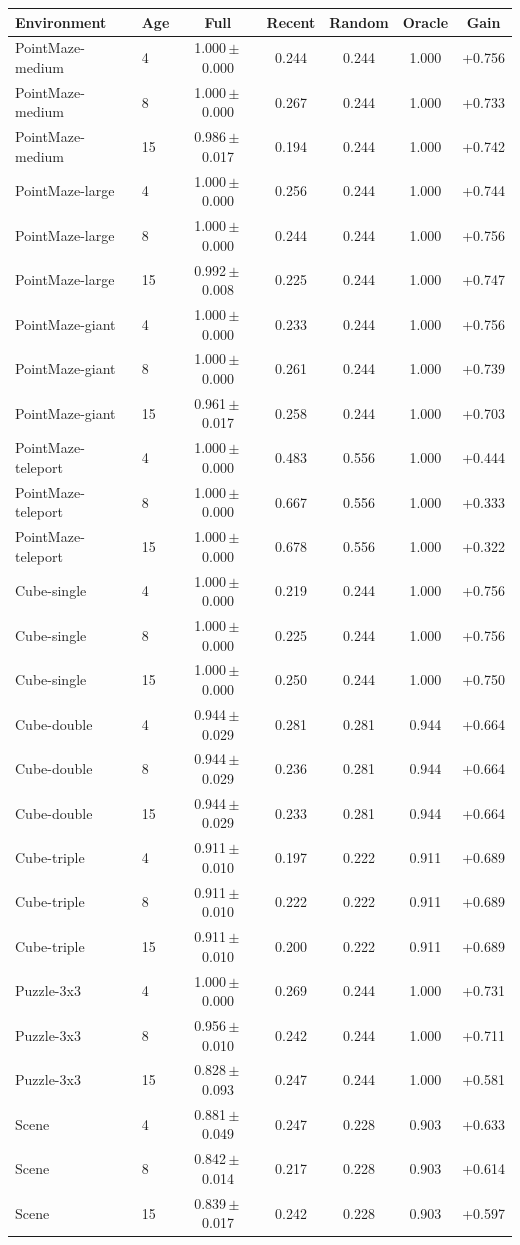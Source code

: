 \begin{tabular}{llccccc}
\toprule
Environment & Age & Full & Recent & Random & Oracle & Gain\\
\midrule
PointMaze-medium & 4 & 1.000\,$\pm$\,0.000 & 0.244 & 0.244 & 1.000 & +0.756\\
PointMaze-medium & 8 & 1.000\,$\pm$\,0.000 & 0.267 & 0.244 & 1.000 & +0.733\\
PointMaze-medium & 15 & 0.986\,$\pm$\,0.017 & 0.194 & 0.244 & 1.000 & +0.742\\
PointMaze-large & 4 & 1.000\,$\pm$\,0.000 & 0.256 & 0.244 & 1.000 & +0.744\\
PointMaze-large & 8 & 1.000\,$\pm$\,0.000 & 0.244 & 0.244 & 1.000 & +0.756\\
PointMaze-large & 15 & 0.992\,$\pm$\,0.008 & 0.225 & 0.244 & 1.000 & +0.747\\
PointMaze-giant & 4 & 1.000\,$\pm$\,0.000 & 0.233 & 0.244 & 1.000 & +0.756\\
PointMaze-giant & 8 & 1.000\,$\pm$\,0.000 & 0.261 & 0.244 & 1.000 & +0.739\\
PointMaze-giant & 15 & 0.961\,$\pm$\,0.017 & 0.258 & 0.244 & 1.000 & +0.703\\
PointMaze-teleport & 4 & 1.000\,$\pm$\,0.000 & 0.483 & 0.556 & 1.000 & +0.444\\
PointMaze-teleport & 8 & 1.000\,$\pm$\,0.000 & 0.667 & 0.556 & 1.000 & +0.333\\
PointMaze-teleport & 15 & 1.000\,$\pm$\,0.000 & 0.678 & 0.556 & 1.000 & +0.322\\
Cube-single & 4 & 1.000\,$\pm$\,0.000 & 0.219 & 0.244 & 1.000 & +0.756\\
Cube-single & 8 & 1.000\,$\pm$\,0.000 & 0.225 & 0.244 & 1.000 & +0.756\\
Cube-single & 15 & 1.000\,$\pm$\,0.000 & 0.250 & 0.244 & 1.000 & +0.750\\
Cube-double & 4 & 0.944\,$\pm$\,0.029 & 0.281 & 0.281 & 0.944 & +0.664\\
Cube-double & 8 & 0.944\,$\pm$\,0.029 & 0.236 & 0.281 & 0.944 & +0.664\\
Cube-double & 15 & 0.944\,$\pm$\,0.029 & 0.233 & 0.281 & 0.944 & +0.664\\
Cube-triple & 4 & 0.911\,$\pm$\,0.010 & 0.197 & 0.222 & 0.911 & +0.689\\
Cube-triple & 8 & 0.911\,$\pm$\,0.010 & 0.222 & 0.222 & 0.911 & +0.689\\
Cube-triple & 15 & 0.911\,$\pm$\,0.010 & 0.200 & 0.222 & 0.911 & +0.689\\
Puzzle-3x3 & 4 & 1.000\,$\pm$\,0.000 & 0.269 & 0.244 & 1.000 & +0.731\\
Puzzle-3x3 & 8 & 0.956\,$\pm$\,0.010 & 0.242 & 0.244 & 1.000 & +0.711\\
Puzzle-3x3 & 15 & 0.828\,$\pm$\,0.093 & 0.247 & 0.244 & 1.000 & +0.581\\
Scene & 4 & 0.881\,$\pm$\,0.049 & 0.247 & 0.228 & 0.903 & +0.633\\
Scene & 8 & 0.842\,$\pm$\,0.014 & 0.217 & 0.228 & 0.903 & +0.614\\
Scene & 15 & 0.839\,$\pm$\,0.017 & 0.242 & 0.228 & 0.903 & +0.597\\
\bottomrule
\end{tabular}
